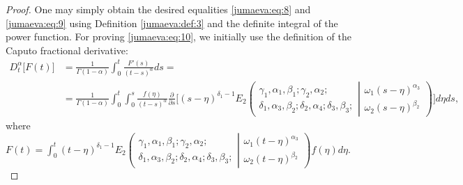 \documentclass[10pt,a4paper]{amsart}
\begin{document}
\begin{proof}
One may simply obtain the desired equalities \eqref{jumaeva:eq:8} and \eqref{jumaeva:eq:9}  using Definition \ref{jumaeva:def:3} and the definite integral of the power function. For proving \eqref{jumaeva:eq:10}, we initially use the definition of the Caputo fractional derivative:
\begin{align*}
   D_t^\alpha\big[F(t)\big]&=\frac{1}{\Gamma(1-\alpha)}\int_0^t \frac{F'(s)}{(t-s)^\alpha} ds= \\
   &=\frac{1}{\Gamma(1-\alpha)}\int_0^t \int_0^s \frac{f(\eta)}{(t-s)^\alpha}\frac{\partial}{\partial s}\bigg[(s-\eta)^{\delta_1-1 }E_2\left(\begin{array}{c}
\gamma_1,\alpha_1, \beta_1 ; \gamma_2, \alpha_2 ; \\
\delta_1, \alpha_3, \beta_2 ;\delta_2, \alpha_4; \delta_3, \beta_3 ; 
\end{array} \left| 
\begin{array}{c}
\omega_1 (s-\eta)^{\alpha_3} \\
\omega_2 (s-\eta)^{\beta_2} 
\end{array} 
\right.
\right)\bigg]d\eta ds,
\end{align*}
where $F(t)=\int_0^t (t-\eta)^{\delta_1-1} E_2\left(\begin{array}{c}
\gamma_1,\alpha_1, \beta_1 ; \gamma_2, \alpha_2 ; \\
\delta_1, \alpha_3, \beta_2 ;\delta_2, \alpha_4; \delta_3, \beta_3 ; 
\end{array} \left| 
\begin{array}{c}
\omega_1 (t-\eta)^{\alpha_3} \\
\omega_2 (t-\eta)^{\beta_2} 
\end{array} 
\right.
\right)f(\eta) d\eta. $


\end{proof}
\end{document}

